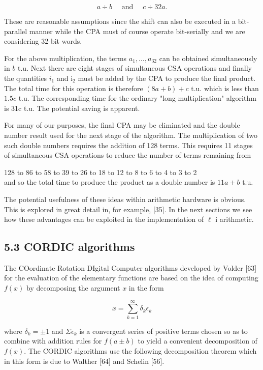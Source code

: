 \documentclass[10pt]{article}
\begin{document}
$$
a \div b \quad \text { and } \quad c \div 32 a .
$$

These are reasonable assumptions since the shift can also be executed in a bit-parallel manner while the CPA must of course operate bit-serially and we are considering 32-bit words.

For the above multiplication, the terms $a_{1}, \ldots, a_{32}$ can be obtained simultaneously in $b$ t.u. Next there are eight stages of simultaneous CSA operations and finally the quantities $i_{1}$ and $\mathrm{i}_{2}$ must be added by the CPA to produce the final product. The total time for this operation is therefore $(8 a+b)+c$ t.u. which is less than $1.5 c$ t.u. The corresponding time for the ordinary "long multiplication" algorithm is 31c t.u. The potential saving is apparent.

For many of our purposes, the final CPA may be eliminated and the double number result used for the next stage of the algorithm. The multiplication of two such double numbers requires the addition of 128 terms. This requires 11 stages of simultaneous CSA operations to reduce the number of terms remaining from

128 to 86 to 58 to 39 to 26 to 18 to 12 to 8 to 6 to 4 to 3 to 2\\
and so the total time to produce the product as a double number is $11 a+b$ t.u.

The potential usefulness of these ideas within arithmetic hardware is obvious. This is explored in great detail in, for example, [35]. In the next sections we see how these advantages can be exploited in the implementation of $\ell$ i arithmetic.

\subsection*{5.3 CORDIC algorithms}
The COordinate Rotation DIgital Computer algorithms developed by Volder [63] for the evaluation of the elementary functions are based on the idea of computing $f(x)$ by decomposing the argument $x$ in the form


\begin{equation*}
x=\sum_{k=1}^{\infty} \delta_{k} \epsilon_{k} \tag{5.3.1}
\end{equation*}


where $\delta_{k}= \pm 1$ and $\Sigma \epsilon_{k}$ is a convergent series of positive terms chosen so as to combine with addition rules for $f(a \pm b)$ to yield a convenient decomposition of $f(x)$. The CORDIC algorithms use the following decomposition theorem which in this form is due to Walther [64] and Schelin [56].
\end{document}
